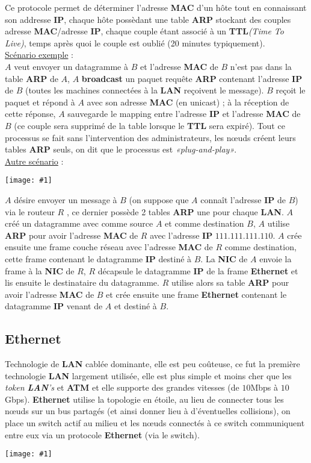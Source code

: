 \documentclass{article}
\newcommand{\imgR}[2]{\begin{center}\texttt{[image: \#1]}\end{center}}
\newcommand{\neuSPs}{n\oe uds }
\begin{document}
\noindent Ce protocole permet de déterminer l'adresse \textbf{MAC} d'un hôte tout en connaissant son addresse 
\textbf{IP}, chaque hôte possèdant une table \textbf{ARP} stockant des couples adresse \textbf{MAC}/adresse 
\textbf{IP}, chaque couple étant associé à un \textbf{TTL}\textit{(Time To Live)}, temps après quoi le couple est
oublié (20 minutes typiquement). \\
\underline{Scénario exemple} : \\
$A$ veut envoyer un datagramme à $B$ et l'adresse \textbf{MAC} de $B$ n'est pas dans la table \textbf{ARP} de 
$A$, $A$ \textbf{broadcast} un paquet requête \textbf{ARP} contenant l'adresse \textbf{IP} de $B$ (toutes les
machines connectées à la \textbf{LAN} reçoivent le message). $B$ reçoit le paquet et répond à $A$ avec son 
adresse \textbf{MAC} (en unicast) ; à la réception de cette réponse, $A$ sauvegarde le mapping entre l'adresse 
\textbf{IP} et l'adresse \textbf{MAC} de $B$ (ce couple sera supprimé de la table lorsque le \textbf{TTL} sera 
expiré). Tout ce processus se fait sans l'intervention des administrateurs, les \neuSPs créent leurs tables 
\textbf{ARP} seuls, on dit que le processus est \textit{«plug-and-play»}. \\
\newpage
\underline{Autre scénario} :
\imgR{CN_114.png}{350}
$A$ désire envoyer un message à $B$ (on suppose que $A$ connaît l'adresse \textbf{IP} de $B$) via le routeur $R$ 
, ce dernier possède 2 tables \textbf{ARP} une pour chaque \textbf{LAN}. $A$ créé un datagramme avec comme source
$A$ et comme destination $B$, $A$ utilise \textbf{ARP} pour avoir l'adresse \textbf{MAC} de $R$ avec l'adresse 
\textbf{IP} $111.111.111.110$. $A$ crée ensuite une frame couche réseau avec l'adresse \textbf{MAC} de $R$ comme
destination, cette frame contenant le datagramme \textbf{IP} destiné à $B$. La \textbf{NIC} de $A$ envoie la 
frame à la \textbf{NIC} de $R$, $R$ décapsule le datagramme \textbf{IP} de la frame \textbf{Ethernet} et lis 
ensuite le destinataire du datagramme. $R$ utilise alors sa table \textbf{ARP} pour avoir l'adresse \textbf{MAC} 
de $B$ et crée ensuite une frame \textbf{Ethernet} contenant le datagramme \textbf{IP} venant de $A$ et destiné à 
$B$.

\subsection{Ethernet}

Technologie de \textbf{LAN} cablée dominante, elle est peu coûteuse, ce fut la première technologie \textbf{LAN} 
largement utilisée, elle est plus simple et moins cher que les \textit{token \textbf{LAN}'s} et \textbf{ATM} et 
elle supporte des grandes vitesses (de $10$Mbps à $10$Gbps). \textbf{Ethernet} utilise la topologie en étoile, au 
lieu de connecter tous les \neuSPs sur un bus partagés (et ainsi donner lieu à d'éventuelles collisions), on place
un switch actif au milieu et les \neuSPs connectés à ce switch communiquent entre eux via un protocole 
\textbf{Ethernet} (via le switch).
\imgR{CN_115.png}{200}
\end{document}
